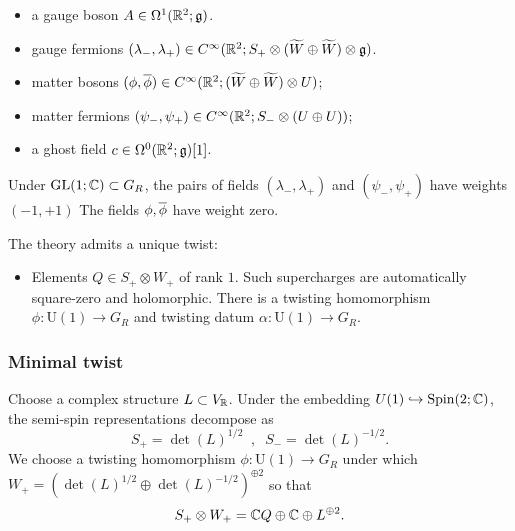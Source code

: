 \documentclass[10pt, oneside]{article}
\renewcommand{\U}{\mathrm{U}}
\begin{document}
\begin{itemize}
\item a gauge boson $A \in \Omega^1(\RR^2;\fg)$.
\item gauge fermions $(\lambda_-, \lambda_+) \in C^\infty(\RR^2 ; S_+ \otimes (\Tilde{W} \oplus \Tilde{W}) \otimes \fg)$. 
\item matter bosons $(\phi, \Bar{\phi}) \in C^\infty(\RR^2 ; (\Tilde{W} \oplus \Tilde{W}) \otimes U)$;
\item matter fermions $(\psi_-, \psi_+) \in C^\infty(\RR^2 ; S_- \otimes (U\oplus U))$;
\item a ghost field $c \in \Omega^0(\RR^2 ; \fg)[1]$.
\end{itemize}

Under $\GL(1; \CC) \subset G_R$, the pairs of fields $(\lambda_-, \lambda_+)$ and $(\psi_-, \psi_+)$ have weights $(-1,+1)$ 
The fields $\phi, \Bar{\phi}$ have weight zero.

The theory admits a unique twist:
\begin{itemize}
\item Elements $Q \in S_+ \otimes W_+$ of rank $1$. 
Such supercharges are automatically square-zero and holomorphic.
There is a twisting homomorphism $\phi : \U(1) \to G_R$ and twisting datum $\alpha : \U(1) \to G_R$. 
\end{itemize}

\subsubsection{Minimal twist}

Choose a complex structure $L \subset V_\RR$. 
Under the embedding $U(1) \hookrightarrow \spin(2;\CC)$, the semi-spin representations decompose as
\[
S_+ = \det(L)^{1/2} \;\; , \;\; S_- = \det(L)^{-1/2} .
\]
We choose a twisting homomorphism $\phi : \U(1) \to G_R$ under which $W_+ = (\det(L)^{1/2} \oplus \det(L)^{-1/2})^{\oplus 2}$
so that
\[
S_+ \otimes W_+ = \CC Q \oplus \CC \oplus L^{\oplus 2} .
\]
\end{document}
